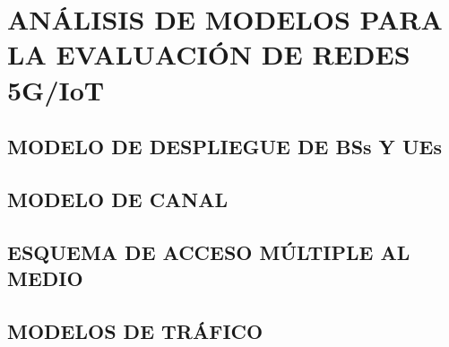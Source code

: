 \section{ANÁLISIS DE MODELOS PARA LA EVALUACIÓN DE REDES 5G/IoT}
\subsection{MODELO DE DESPLIEGUE DE BSs Y UEs}
\subsection{MODELO DE CANAL}
\subsection{ESQUEMA DE ACCESO MÚLTIPLE AL MEDIO}
\subsection{MODELOS DE TRÁFICO}


